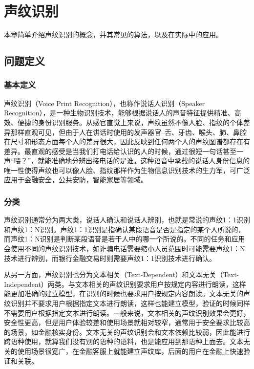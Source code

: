 %
%
%
\chapter{声纹识别}
\label{voiceprint} 

本章简单介绍声纹识别的概念，并其常见的算法，以及在实际中的应用。


\section{问题定义}

\subsection{基本定义}

声纹识别（Voice Print Recognition），也称作说话人识别（Speaker Recognition），是一种生物识别技术，能够根据说话人的声音特征提供精准、高效、便捷的身份识别服务。从感官直觉上来说，声纹虽然不像人脸、指纹的个体差异那样直观可见，但由于人在讲话时使用的发声器官--舌、牙齿、喉头、肺、鼻腔在尺寸和形态方面每个人的差异很大，因此反映到任何两个人的声纹图谱都存在有差异。最直观的感受是当我们打电话给认识的人的时候，通过很短一句话甚至一声“喂？”，就能准确地分辨出接电话的是谁。这种语音中承载的说话人身份信息的唯一性使得声纹也可以像人脸、指纹那样作为生物信息识别技术的生力军，可广泛应用于金融安全，公共安防，智能家居等领域。


\subsection{分类}

声纹识别通常分为两大类，说话人确认和说话人辨别，也就是常说的声纹1：1识别和声纹1：N识别。声纹1：1识别是指确认某段语音是否是指定的某个人所说的，而声纹1：N识别是判断某段语音是若干人中的哪一个所说的。不同的任务和应用会使用不同的声纹识别技术，如诈骗电话需要缩小人员范围时可能需要声纹1：N技术进行辨别，而银行金融交易时则需要声纹1：1识别技术进行确认。

从另一方面，声纹识别也分为文本相关（Text-Dependent）和文本无关（Text-Independent）两类。与文本相关的声纹识别要求用户按规定内容进行朗读，这样能更加准确的建立模型，在识别的时候也要求用户按规定内容朗读。文本无关的声纹识别并不要求用户根据指定文本进行朗读，这样也能建立模型，验证的时候同样不需要用户根据指定文本进行朗读。一般来说，文本相关的声纹识别效果会更好，安全性更高，但是用户体验较差和使用场景就相对较窄，通常用于安全要求比较高的场景，如金融核实身份。文本无关的声纹识别会和文本依赖比较弱，因此能进行跨语种使用，就算我们没有别的语种的语料，也是能应用到那语种上面去。文本无关的使用场景很宽广，在金融客服上就能建立声纹库，后面的用户在金融上快速验证和关联。

